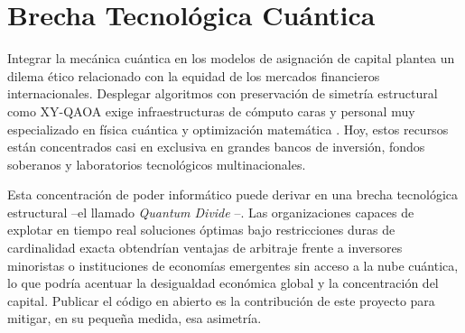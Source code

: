 \section{Brecha Tecnológica Cuántica}
\label{sec:Brecha Tecnológica Cuántica}

Integrar la mecánica cuántica en los modelos de asignación de capital plantea un dilema ético relacionado con la equidad de los mercados financieros internacionales. Desplegar algoritmos con preservación de simetría estructural como XY-QAOA exige infraestructuras de cómputo caras y personal muy especializado en física cuántica y optimización matemática \cite{PMBOK2021}. Hoy, estos recursos están concentrados casi en exclusiva en grandes bancos de inversión, fondos soberanos y laboratorios tecnológicos multinacionales.

Esta concentración de poder informático puede derivar en una brecha tecnológica estructural --el llamado \textit{Quantum Divide} \cite{NisqSociety2022}--. Las organizaciones capaces de explotar en tiempo real soluciones óptimas bajo restricciones duras de cardinalidad exacta obtendrían ventajas de arbitraje frente a inversores minoristas o instituciones de economías emergentes sin acceso a la nube cuántica, lo que podría acentuar la desigualdad económica global y la concentración del capital. Publicar el código en abierto es la contribución de este proyecto para mitigar, en su pequeña medida, esa asimetría.